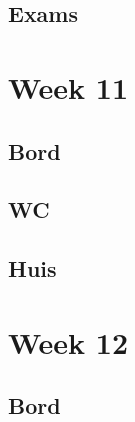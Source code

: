 \documentclass[a4paper]{report}
\begin{document}




\subsection{Exams}





\section{Week 11}

\subsection{Bord}




\subsection{WC}




\subsection{Huis}






\section{Week 12}

\subsection{Bord}






\end{document}
